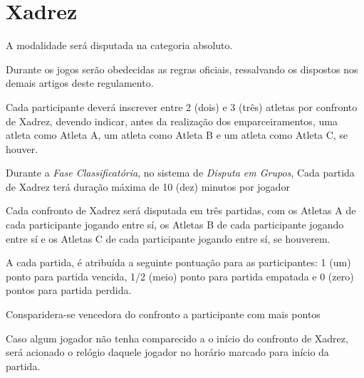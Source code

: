 {\let\clearpage\relax \chapter{Xadrez}}

\begin{article}
	A modalidade será disputada na categoria absoluto.
\end{article}

\begin{article}
	Durante os jogos serão obedecidas as regras oficiais, ressalvando os dispostos nos demais artigos deste regulamento.
\end{article}

\begin{article}
	Cada participante deverá inscrever entre 2 (dois) e 3 (três) atletas por confronto de Xadrez, devendo indicar, antes da realização dos emparceiramentos, uma atleta como Atleta A, um atleta como Atleta B e um atleta como Atleta C, se houver.
\end{article}

\begin{article}
	Durante a \textit{Fase Classificatória}, no sistema de \textit{Disputa em Grupos}, Cada partida de Xadrez terá duração máxima de 10 (dez) minutos por jogador
\end{article}

\begin{article}
	Cada confronto de Xadrez será disputada em três partidas, com os Atletas A de cada participante jogando entre sí, os Atletas B de cada participante jogando entre sí e os Atletas C de cada participante jogando entre sí, se houverem.

	\begin{xparagraph}
		A cada partida, é atribuída a seguinte pontuação para as participantes: 1 (um) ponto para partida vencida, 1/2 (meio) ponto para partida empatada e 0 (zero) pontos para partida perdida.
	\end{xparagraph}

	\begin{xparagraph}
		Consparidera-se vencedora do confronto a participante com mais pontos
	\end{xparagraph}

	\begin{xparagraph}
		Caso algum jogador não tenha comparecido a o início do confronto de Xadrez, será acionado o relógio daquele jogador no horário marcado para início da partida.
	\end{xparagraph}
\end{article}

